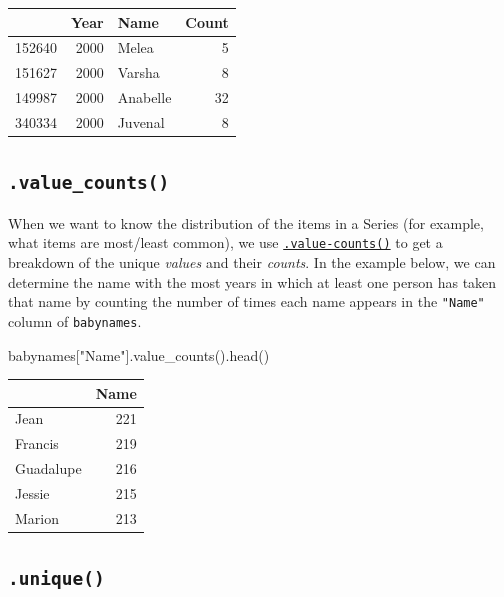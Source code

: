 \documentclass[
  letterpaper,
  DIV=11,
  numbers=noendperiod]{scrreprt}
\newenvironment{Shaded}{\begin{snugshade}}{\end{snugshade}}
\newcommand{\NormalTok}[1]{\textcolor[rgb]{0.00,0.23,0.31}{#1}}
\newcommand{\StringTok}[1]{\textcolor[rgb]{0.13,0.47,0.30}{#1}}
\begin{document}
\begin{tabular}{lrlr}
\toprule
{} &  Year &      Name &  Count \\
\midrule
152640 &  2000 &     Melea &      5 \\
151627 &  2000 &    Varsha &      8 \\
149987 &  2000 &  Anabelle &     32 \\
340334 &  2000 &   Juvenal &      8 \\
\bottomrule
\end{tabular}

\hypertarget{value_counts}{%
\subsection{\texorpdfstring{\texttt{.value\_counts()}}{.value\_counts()}}\label{value_counts}}

When we want to know the distribution of the items in a Series (for
example, what items are most/least common), we use
\href{https://pandas.pydata.org/docs/reference/api/pandas.Series.value_counts.html}{\texttt{.value-counts()}}
to get a breakdown of the unique \emph{values} and their \emph{counts}.
In the example below, we can determine the name with the most years in
which at least one person has taken that name by counting the number of
times each name appears in the \texttt{"Name"} column of
\texttt{babynames}.

\begin{Shaded}
\begin{Highlighting}[]
\NormalTok{babynames[}\StringTok{"Name"}\NormalTok{].value\_counts().head()}
\end{Highlighting}
\end{Shaded}

\begin{tabular}{lr}
\toprule
{} &  Name \\
\midrule
Jean      &   221 \\
Francis   &   219 \\
Guadalupe &   216 \\
Jessie    &   215 \\
Marion    &   213 \\
\bottomrule
\end{tabular}

\hypertarget{unique}{%
\subsection{\texorpdfstring{\texttt{.unique()}}{.unique()}}\label{unique}}
\end{document}
